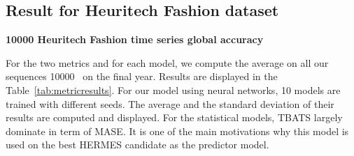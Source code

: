 \documentclass{article} %
\newcommand{\numberts}{10000}
\begin{document}










\subsection{Result for Heuritech Fashion dataset}





\textbf{10000 Heuritech Fashion time series global accuracy}

For the two metrics and for each model, we compute the average on all our sequences \numberts~  on the final year. Results are displayed in the Table~\ref{tab:metricresults}. For our model using neural networks, 10 models are trained  with different seeds. The average and the standard deviation of their results are computed and displayed. For the statistical models, TBATS largely dominate in term of MASE. It is one of the main motivations why this model is used on the best HERMES candidate as the predictor model. %
\end{document}
